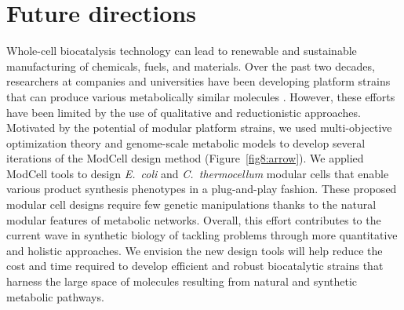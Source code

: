 
\renewcommand{\thefigure}{\roman{figure}} %
\setcounter{figure}{0}

\chapter*{Future directions}\label{ch:conclusion}





Whole-cell biocatalysis technology can lead to renewable and sustainable manufacturing of chemicals, fuels, and materials.
Over the past two decades, researchers at companies and universities have been developing platform strains that can produce various metabolically similar molecules \citep{nielsen2016}.
However, these efforts have been limited by the use of qualitative and reductionistic approaches.
Motivated by the potential of modular platform strains, we used multi-objective optimization theory and  genome-scale metabolic models to develop several iterations of the ModCell design method (Figure~\ref{fig8:arrow}).
We applied ModCell tools to design \textit{E.~coli} and \textit{C.~thermocellum} modular cells that enable various product synthesis phenotypes in a plug-and-play fashion.
These proposed modular cell designs require few genetic manipulations thanks to the natural modular features of metabolic networks.
Overall, this effort contributes to the current wave in synthetic biology of tackling problems through more quantitative and holistic approaches.
We envision the new design tools will help reduce the cost and time required to develop efficient and robust biocatalytic strains that harness the large space of molecules resulting from natural and synthetic metabolic pathways.

